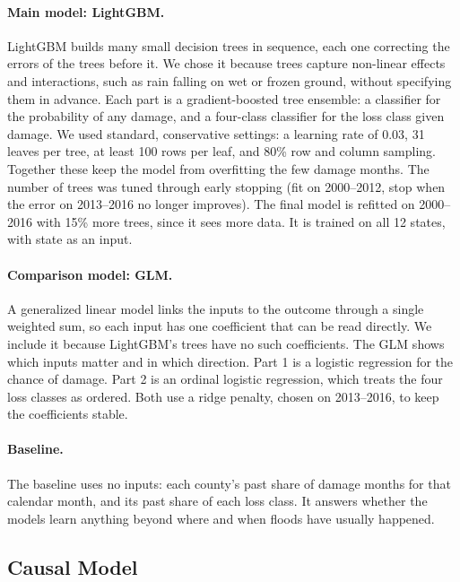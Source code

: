 \documentclass[10pt,twocolumn]{article}
\begin{document}
\paragraph{Main model: LightGBM.} LightGBM builds many small decision trees in sequence, each one
correcting the errors of the trees before it. We chose it because trees capture non-linear
effects and interactions, such as rain falling on wet or frozen ground, without specifying them
in advance. Each part is a gradient-boosted tree ensemble:  a classifier for the probability of any damage, and a four-class classifier for the loss class given damage. We used standard, conservative settings: a learning rate of 0.03, 31 leaves per tree, at least 100 rows per leaf, and 80\%
row and column sampling. Together these keep the model from overfitting the few damage months.
The number of trees was tuned through early stopping (fit on 2000--2012, stop when the error on
2013--2016 no longer improves). The final model is refitted on 2000--2016 with 15\% more trees,
since it sees more data. It is trained on all 12 states, with state as an input.


\paragraph{Comparison model: GLM.} A generalized linear model links the inputs to the outcome
through a single weighted sum, so each input has one coefficient that can be read directly.
We include it because LightGBM's trees have no such coefficients. The GLM shows which inputs
matter and in which direction. Part 1 is a logistic regression for the chance of damage. Part 2
is an ordinal logistic regression, which treats the four loss classes as ordered. Both use a
ridge penalty, chosen on 2013--2016, to keep the coefficients stable.

\paragraph{Baseline.} The baseline uses no inputs: each county's past share of damage months for
that calendar month, and its past share of each loss class. It answers whether the models
learn anything beyond where and when floods have usually happened.

\subsection{Causal Model}
\label{sec:causal}
\end{document}
